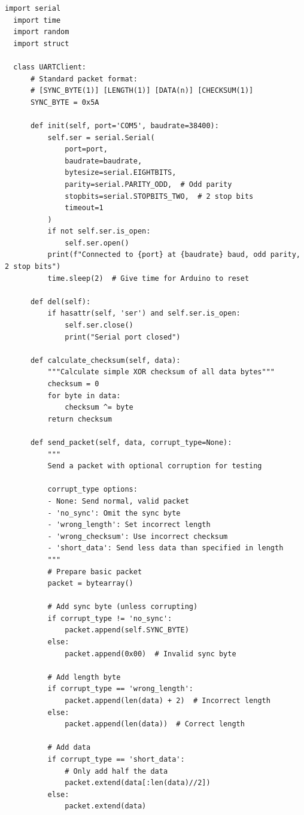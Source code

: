 \documentclass{article}
\begin{document}
\begin{lstlisting}[caption={client}, label={lst:example}]
  import serial
  import time
  import random
  import struct
  
  class UARTClient:
      # Standard packet format:
      # [SYNC_BYTE(1)] [LENGTH(1)] [DATA(n)] [CHECKSUM(1)]
      SYNC_BYTE = 0x5A
  
      def init(self, port='COM5', baudrate=38400):
          self.ser = serial.Serial(
              port=port, 
              baudrate=baudrate, 
              bytesize=serial.EIGHTBITS,
              parity=serial.PARITY_ODD,  # Odd parity
              stopbits=serial.STOPBITS_TWO,  # 2 stop bits
              timeout=1
          )
          if not self.ser.is_open:
              self.ser.open()
          print(f"Connected to {port} at {baudrate} baud, odd parity, 2 stop bits")
          time.sleep(2)  # Give time for Arduino to reset
  
      def del(self):
          if hasattr(self, 'ser') and self.ser.is_open:
              self.ser.close()
              print("Serial port closed")
  
      def calculate_checksum(self, data):
          """Calculate simple XOR checksum of all data bytes"""
          checksum = 0
          for byte in data:
              checksum ^= byte
          return checksum
  
      def send_packet(self, data, corrupt_type=None):
          """
          Send a packet with optional corruption for testing
          
          corrupt_type options:
          - None: Send normal, valid packet
          - 'no_sync': Omit the sync byte
          - 'wrong_length': Set incorrect length
          - 'wrong_checksum': Use incorrect checksum
          - 'short_data': Send less data than specified in length
          """
          # Prepare basic packet
          packet = bytearray()
          
          # Add sync byte (unless corrupting)
          if corrupt_type != 'no_sync':
              packet.append(self.SYNC_BYTE)
          else:
              packet.append(0x00)  # Invalid sync byte
              
          # Add length byte
          if corrupt_type == 'wrong_length':
              packet.append(len(data) + 2)  # Incorrect length
          else:
              packet.append(len(data))  # Correct length
              
          # Add data
          if corrupt_type == 'short_data':
              # Only add half the data
              packet.extend(data[:len(data)//2])
          else:
              packet.extend(data)
              

\end{lstlisting}
\end{document}
